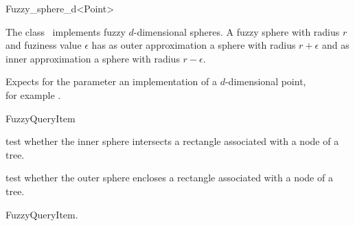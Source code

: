 

\begin{ccRefClass}{Fuzzy_sphere_d<Point>}  %


\ccDefinition
  
The class \ccRefName\ implements fuzzy $d$-dimensional spheres.
A fuzzy sphere with radius $r$ and fuziness value $\epsilon$ has
as outer approximation a sphere with radius $r+\epsilon$ and
as inner approximation a sphere with radius $r-\epsilon$. 


\ccParameters

Expects for the parameter  an implementation of a $d$-dimensional point,\\
for example . 

\ccIsModel

FuzzyQueryItem

\ccTypes


\ccCreation
{}  %




\ccOperations


{test whether the inner sphere intersects a rectangle
associated with a node of a tree.}

{test whether the outer sphere encloses a rectangle
associated with a node of a tree.}

\ccSeeAlso

FuzzyQueryItem.

\end{ccRefClass}


